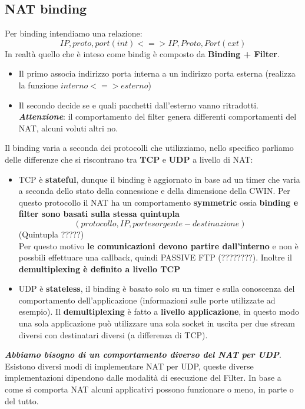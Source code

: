 \documentclass[12pt]{article}
\begin{document}
		\subsection{NAT binding}
			Per binding intendiamo una relazione: $${IP,proto,port}(int)<=>{IP,Proto,Port}(ext) $$
			In realtà quello che è inteso come bindig è composto da \textbf{Binding + Filter}.
			\begin{itemize}
				\item Il primo associa indirizzo porta interna a un indirizzo porta esterna (realizza la funzione $interno <=> esterno$)
				\item Il secondo decide se e quali pacchetti dall'esterno vanno ritradotti. \textbf{\textit{Attenzione}}: il comportamento del filter genera differenti comportamenti del NAT, alcuni voluti altri no.
			\end{itemize}
			Il binding varia a seconda dei protocolli che utilizziamo, nello specifico parliamo delle differenze che si riscontrano tra \textbf{TCP} e \textbf{UDP} a livello di NAT:
			\begin{itemize}
				\item TCP è \textbf{stateful}, dunque il binding è aggiornato in base ad un timer che varia a seconda dello stato della connessione e della dimensione della CWIN. Per questo protocollo il NAT ha un comportamento \textbf{symmetric} ossia \textbf{binding e filter sono basati sulla stessa quintupla} 
				$$(protocollo, IP, porte sorgente-destinazione) $$
				(Quintupla ?????)\\
				Per questo motivo \textbf{le comunicazioni  devono partire dall'interno} e non è possbili effettuare una callback, quindi PASSIVE FTP (????????). Inoltre il \textbf{demultiplexing è definito a livello TCP} 
				\item UDP è \textbf{stateless}, il binding è basato solo su un timer e sulla conoscenza del comportamento dell'applicazione (informazioni sulle porte utilizzate ad esempio). Il \textbf{demultiplexing} è fatto a \textbf{livello applicazione}, in questo modo una sola applicazione può utilizzare una sola socket in uscita per due stream diversi con destinatari diversi (a differenza di TCP).
			\end{itemize}
			\textit{\textbf{Abbiamo bisogno di un comportamento diverso del NAT per UDP}}.\\
			Esistono diversi modi di implementare NAT per UDP, queste diverse implementazioni dipendono dalle modalità di esecuzione del Filter. In base a come si comporta NAT alcuni applicativi possono funzionare o meno, in parte o del tutto.
\end{document}
